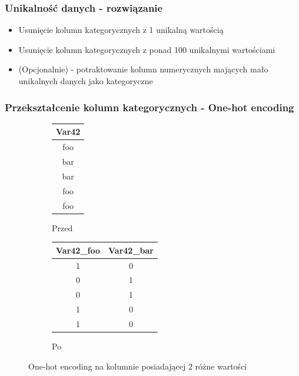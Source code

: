 \documentclass{beamer}
\begin{document}
    \begin{frame}
        \frametitle{Unikalność danych - rozwiązanie}
        \begin{itemize}
            \item Usunięcie kolumn kategorycznych z 1 unikalną wartością
            \item Usunięcie kolumn kategorycznych z ponad 100 unikalnymi wartościami
            \item (Opcjonalnie) - potraktowanie kolumn numerycznych mających mało unikalnych danych jako kategoryczne
        \end{itemize}
    \end{frame}

    \begin{frame}
        \frametitle{Przekształcenie kolumn kategorycznych - One-hot encoding}
        \begin{figure}
            \centering
            \begin{subfigure}{0.4\textwidth}
                \centering
                \begin{tabular}{c}
                    Var42 \\
                    \hline
                    foo \\
                    bar \\
                    bar \\
                    foo \\
                    foo \\
                \end{tabular}
                \caption{Przed}
            \end{subfigure}
            \begin{subfigure}{0.4\textwidth}
                \centering
                \begin{tabular}{c|c}
                    Var42\_foo & Var42\_bar \\
                    \hline
                    1 & 0 \\
                    0 & 1 \\
                    0 & 1 \\
                    1 & 0 \\
                    1 & 0 \\
                \end{tabular}
                \caption{Po}
            \end{subfigure}
            \caption{One-hot encoding na kolumnie posiadającej 2 różne wartości}
            \label{fig:one-hot-encoding}
        \end{figure}
    \end{frame}
\end{document}
